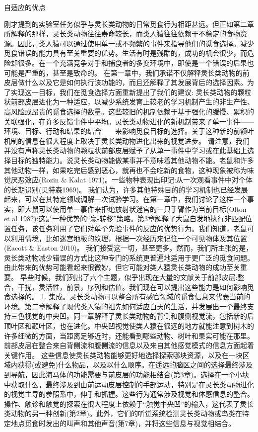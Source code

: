 自适应的优点

刚才提到的实验室任务似乎与灵长类动物的日常觅食行为相距甚远。但正如第二章所解释的那样，灵长类动物往往寿命较长，而类人猿往往依赖于不稳定的食物资源。因此，类人猿可以通过使用单一或不频繁的事件来指导他们的觅食选择。减少觅食错误的能力具有至关重要的优势。生活有时是残酷的，成功的机会很少，而危险却很多。在一个充满竞争对手和捕食者的多变环境中，即使是一个错误的后果也可能是严重的，甚至是致命的。
在第一章中，我们承诺不仅解释灵长类动物的前皮层做什么以及它是如何执行该功能的，而且还解释了其发展背后的选择因素。为了实现这一目标，我们在觅食选择方面重新提出了我们的建议:
灵长类动物的颗粒状前部皮层进化为一种适应，以减少系统发育上较老的学习机制产生的非生产性、高风险或昂贵的觅食选择的数量。这些较旧的机制依赖于基于强化的缓慢、累积的关联强化，在许多反馈事件中平均。灵长类动物进化的新机制带来了单一事件——环境、目标、行动和结果的结合——来影响觅食目标的选择。关于这种新的前额叶机制的信息在很大程度上取决于灵长类动物进化出来的视觉进步。
请注意，我们并没有声称灵长类动物的颗粒状前部皮层赋予了从单一事件中学习或在此基础上选择目标的独特能力。说灵长类动物能做某事并不意味着其他动物不能。老鼠和许多其他动物一样，如果吃完后感到恶心，就再也不会吃新的食物，这种现象被称为味觉厌恶效应(Rozin \& Kalat 1971)。一些物种表现出印记:从一次观看事件中对个体的长期识别(贝特森1969)。
我们认为，许多其他特殊目的的学习机制也已经发展起来，可以在其特定领域调解一次试验学习。在第一章中，我们讨论了这样一个事实，即大鼠可以使用单一事件来拒绝放射状迷宫的一只手臂作为当前目标(Olton et al 1982):这是一种优势的“赢-转移”策略。第3章解释了大鼠自发地执行非匹配位置任务，该任务利用了它们对单个先验事件的反应的优势行为。我们知道，老鼠可以利用情境，比如迷宫地板的纹理，根据一次经历来记住一个可见物体及其位置(Eacott \& Easton 2010)。
我们接受这一切，甚至更多。然而，我们所主张的是，灵长类动物减少错误的方式比这种专门的系统更普遍地适用于更广泛的觅食问题。由此带来的优势可能看起来很微妙，但它可能对类人猿灵长类动物的成功至关重要。
早些时候，我们列出了六个主题，似乎出现在大量的文献关于前部皮层:整合，干扰，灵活性，前景，序列和估值。我们现在可以提出这些能力是如何影响觅食选择的。
1. 集成。灵长类动物可以整合所有感官领域的觅食信息来代表当前的环境。第二章解释了现代类人猿的祖先如何适应白天的生活，并发展出一个最终支持三色视觉的中央凹。同一章解释了灵长类动物的背侧和腹侧视觉流，包括新的后顶叶区和颞叶区，也在进化。中央凹视觉使类人猿在很远的地方就能注意到树木的许多细微的方面，当距离足够近时，还能看到哪些动物、树叶和果实可能在那里。前部皮层在整合来自背侧流和腹侧流的信息以及来自其他感觉模式的信息方面起着关键作用。
这些信息使灵长类动物能够更好地选择探索哪块资源，以及在一块区域内获得(或避免)什么物品，以及以什么顺序。在遥远的脑区之间的选择最终涉及到导航，因此海马体的功能需要与前皮层的功能相结合(第3章)。选择在一个小块中获取什么，最终涉及到由前运动皮层控制的手部运动，特别是在灵长类动物进化的视觉主导的参照系中，伸手和抓握。这些行为通常涉及视觉和体感信息的整合。操作、触诊和触觉的探索在很大程度上依赖于“触觉中央凹”的输入，这代表了灵长类动物的另一种创新(第2章)。此外，它们的听觉系统检测灵长类动物或鸟类在特定地点觅食时发出的叫声和其他声音(第7章)，并将这些信息与视觉相结合。
